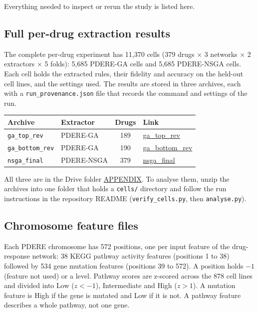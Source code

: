\begin{appendices}
Everything needed to inspect or rerun the study is listed here.

\subsection{Full per-drug extraction results}
\label{app:data-results}

The complete per-drug experiment has 11,370 cells (379 drugs $\times$ 3 networks $\times$ 2 extractors $\times$ 5 folds): 5,685 PDERE-GA cells and 5,685 PDERE-NSGA cells. Each cell holds the extracted rules, their fidelity and accuracy on the held-out cell lines, and the settings used. The results are stored in three archives, each with a \texttt{run\_provenance.json} file that records the command and settings of the run.

\begin{table}[H]
\centering
\small
\begin{tabularx}{\textwidth}{@{}llcY@{}}
\toprule
\textbf{Archive} & \textbf{Extractor} & \textbf{Drugs} & \textbf{Link} \\
\midrule
\texttt{ga\_top\_rev} & PDERE-GA & 189 & \href{https://drive.google.com/file/d/1vZ9ZFul-KmKWqnsSMWdWHV4CVNh_n3Ss/view?usp=drive_link}{ga\_top\_rev} \\
\texttt{ga\_bottom\_rev} & PDERE-GA & 190 & \href{https://drive.google.com/file/d/1lAGty4Nq5CPfCwCa-RQTd6lFtC17cId4/view?usp=drive_link}{ga\_bottom\_rev} \\
\texttt{nsga\_final} & PDERE-NSGA & 379 & \href{https://drive.google.com/file/d/1L1wWk8dy6c1hnCI6QewStOohlpbfy7gI/view?usp=drive_link}{nsga\_final} \\
\bottomrule
\end{tabularx}
\end{table}

All three are in the Drive folder \href{https://drive.google.com/drive/folders/1YIIrkWfg-eUVOTwJKQsFeaIrR9JQLwUV?usp=sharing}{APPENDIX}. To analyse them, unzip the archives into one folder that holds a \texttt{cells/} directory and follow the run instructions in the repository README (\texttt{verify\_cells.py}, then \texttt{analyse.py}).

\subsection{Chromosome feature files}
\label{app:data-features}

Each PDERE chromosome has 572 positions, one per input feature of the drug-response network: 38 KEGG pathway activity features (positions 1 to 38) followed by 534 gene mutation features (positions 39 to 572). A position holds $-1$ (feature not used) or a level. Pathway scores are z-scored across the 878 cell lines and divided into Low ($z < -1$), Intermediate and High ($z > 1$). A mutation feature is High if the gene is mutated and Low if it is not. A pathway feature describes a whole pathway, not one gene.


\end{appendices}
